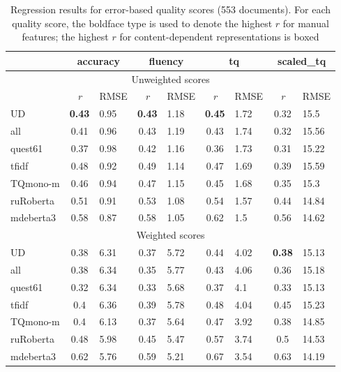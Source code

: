 \begin{table}[H]
	\centering
	\begin{tabular}{l|cl|cl|cl|cl}
		\toprule
		& \multicolumn{2}{c|}{accuracy} & \multicolumn{2}{c|}{fluency}  & \multicolumn{2}{c|}{tq} & \multicolumn{2}{c|}{scaled\_tq}    \\
		\midrule
		\multicolumn{9}{c}{Unweighted scores} \\
		\midrule
		       & \textit{r}  & RMSE & \textit{r}  & RMSE & \textit{r}  & RMSE & \textit{r} & RMSE  \\
		\midrule
			UD     & \textbf{0.43} & 0.95 & \textbf{0.43} & 1.18 & \textbf{0.45} & 1.72 & 0.32 & 15.5  \\
			all             & 0.41 & 0.96 & 0.43 & 1.19 & 0.43 & 1.74 & 0.32 & 15.56 \\
			quest61         & 0.37 & 0.98 & 0.42 & 1.16 & 0.36 & 1.73 & 0.31 & 15.22 \\
			\midrule
			tfidf           & 0.48 & 0.92 & 0.49 & 1.14 & 0.47 & 1.69 & 0.39 & 15.59 \\
			TQmono-m        & 0.46 & 0.94 & 0.47 & 1.15 & 0.45 & 1.68 & 0.35 & 15.3  \\
			ruRoberta & 0.51 & 0.91 & 0.53 & 1.08 & 0.54 & 1.57 & 0.44 & 14.84 \\
			mdeberta3  & 0.58 & 0.87 & 0.58 & 1.05 & 0.62 & 1.5  & 0.56 & 14.62 \\
		\midrule
		\midrule
		\multicolumn{9}{c}{Weighted scores} \\
		\midrule
		UD              & 0.38 & 6.31 & 0.37 & 5.72 & 0.44 & 4.02 & \textbf{0.38} & 15.13 \\
		all             & 0.38 & 6.34 & 0.35 & 5.77 & 0.43 & 4.06 & 0.36 & 15.18 \\
		quest61         & 0.32 & 6.34 & 0.33 & 5.68 & 0.37 & 4.1  & 0.33 & 15.13 \\
		\midrule
		tfidf           & 0.4  & 6.36 & 0.39 & 5.78 & 0.48 & 4.04 & 0.45 & 15.23 \\
		TQmono-m        & 0.4  & 6.13 & 0.37 & 5.64 & 0.47 & 3.92 & 0.38 & 14.85 \\
		ruRoberta & 0.48 & 5.98 & 0.45 & 5.47 & 0.57 & 3.74 & 0.5  & 14.53 \\
		mdeberta3  & \boxit{0.3in}0.62 & 5.76 & \boxit{0.3in}0.59 & 5.21 & \boxit{0.3in}0.67 & 3.54 & \boxit{0.3in}0.63 & 14.19 \\
		\bottomrule
	\end{tabular}
\caption{\label{tab:doc_err_double}Regression results for error-based quality scores (553 documents). For each quality score, the boldface type is used to denote the highest $r$ for manual features; the highest $r$ for content-dependent representations is boxed}
\end{table}

